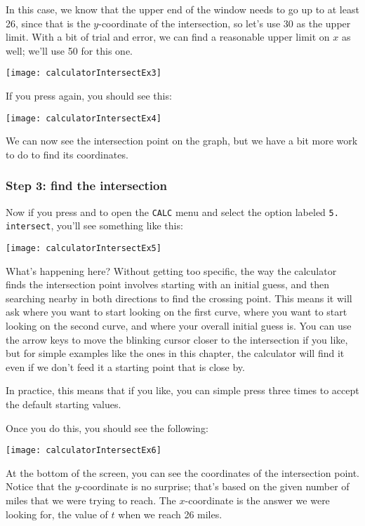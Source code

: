 In this case, we know that the upper end of the window needs to go up to at least 26, since that is the $y$-coordinate of the intersection, so let's use 30 as the upper limit.  With a bit of trial and error, we can find a reasonable upper limit on $x$ as well; we'll use 50 for this one.
\begin{center}
\texttt{[image: calculatorIntersectEx3]}
\end{center}

If you press  again, you should see this:
\begin{center}
\texttt{[image: calculatorIntersectEx4]}
\end{center}

We can now see the intersection point on the graph, but we have a bit more work to do to find its coordinates.
\pagebreak

\subsubsection*{Step 3: find the intersection}
Now if you press  and  to open the \texttt{CALC} menu and select the option labeled \texttt{5. intersect}, you'll see something like this:
\begin{center}
\texttt{[image: calculatorIntersectEx5]}
\end{center}

What's happening here?  Without getting too specific, the way the calculator finds the intersection point involves starting with an initial guess, and then searching nearby in both directions to find the crossing point.  This means it will ask where you want to start looking on the first curve, where you want to start looking on the second curve, and where your overall initial guess is.  You can use the arrow keys to move the blinking cursor closer to the intersection if you like, but for simple examples like the ones in this chapter, the calculator will find it even if we don't feed it a starting point that is close by.

In practice, this means that if you like, you can simple press  three times to accept the default starting values.

Once you do this, you should see the following:
\begin{center}
\texttt{[image: calculatorIntersectEx6]}
\end{center}

At the bottom of the screen, you can see the coordinates of the intersection point.  Notice that the $y$-coordinate is no surprise; that's based on the given number of miles that we were trying to reach.  The $x$-coordinate is the answer we were looking for, the value of $t$ when we reach 26 miles.


